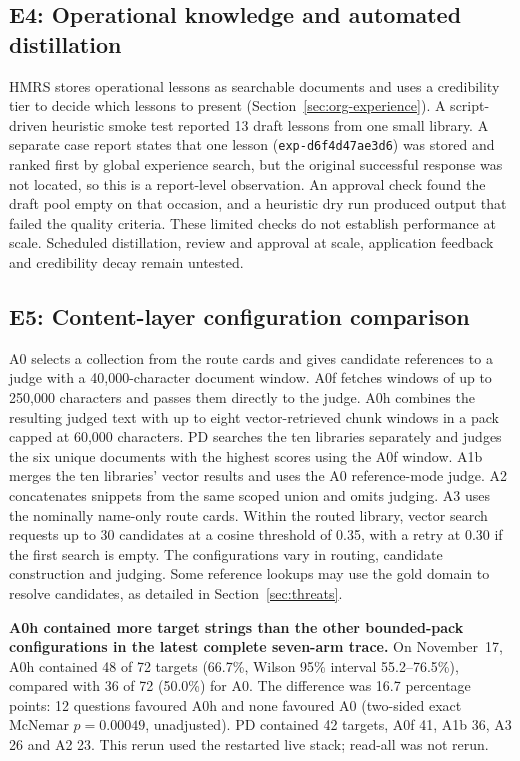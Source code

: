 \subsection{E4: Operational knowledge and automated distillation}
\label{sec:e3}
HMRS stores operational lessons as searchable documents and uses a
credibility tier to decide which lessons to present
(Section~\ref{sec:org-experience}). A script-driven heuristic smoke test
reported 13 draft lessons from one small library. A separate case report
states that one lesson (\texttt{exp-d6f4d47ae3d6}) was stored and ranked
first by global experience search, but the original successful response
was not located, so this is a report-level observation. An approval check
found the draft pool empty on that occasion, and a heuristic dry run
produced output that failed the quality criteria. These limited checks do
not establish performance at scale. Scheduled distillation, review and
approval at scale, application feedback and credibility decay remain
untested.

\subsection{E5: Content-layer configuration comparison}
\label{sec:ladder-opt}
A0 selects a collection from the route cards and gives candidate references
to a judge with a 40{,}000-character document window. A0f fetches windows of
up to 250{,}000 characters and passes them directly to the judge. A0h
combines the resulting judged text with up to eight vector-retrieved chunk
windows in a pack capped at 60{,}000 characters. PD searches the ten libraries
separately and judges the six unique documents with the highest scores using
the A0f window. A1b merges the ten libraries' vector results and uses the A0
reference-mode judge. A2 concatenates snippets from the same scoped union
and omits judging. A3 uses the nominally name-only route cards. Within the
routed library, vector search requests up to 30 candidates at a cosine
threshold of 0.35, with a retry at 0.30 if the first search is empty.
The configurations vary in routing, candidate construction and judging.
Some reference lookups may use the gold domain to resolve candidates,
as detailed in Section~\ref{sec:threats}.

\textbf{A0h contained more target strings than the other bounded-pack
configurations in the latest complete seven-arm trace.} On November~17,
A0h contained 48 of 72 targets (66.7\%, Wilson 95\% interval
55.2--76.5\%), compared with 36 of 72 (50.0\%) for A0. The difference
was 16.7 percentage points: 12 questions favoured A0h and none favoured
A0 (two-sided exact McNemar $p=0.00049$, unadjusted). PD contained 42
targets, A0f 41, A1b 36, A3 26 and A2 23. This rerun used the
restarted live stack; read-all was not rerun.

